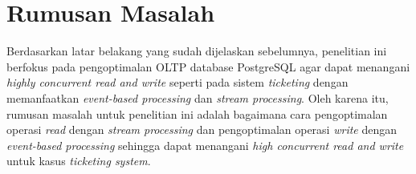 \section{Rumusan Masalah}

Berdasarkan latar belakang yang sudah dijelaskan sebelumnya, penelitian ini berfokus pada pengoptimalan OLTP database PostgreSQL agar dapat menangani \textit{highly concurrent read and write} seperti pada sistem \textit{ticketing} dengan memanfaatkan \textit{event-based processing} dan \textit{stream processing}. Oleh karena itu, rumusan masalah untuk penelitian ini adalah bagaimana cara pengoptimalan operasi \textit{read} dengan \textit{stream processing} dan pengoptimalan operasi \textit{write} dengan \textit{event-based processing} sehingga dapat menangani \textit{high concurrent read and write} untuk kasus \textit{ticketing system}.

